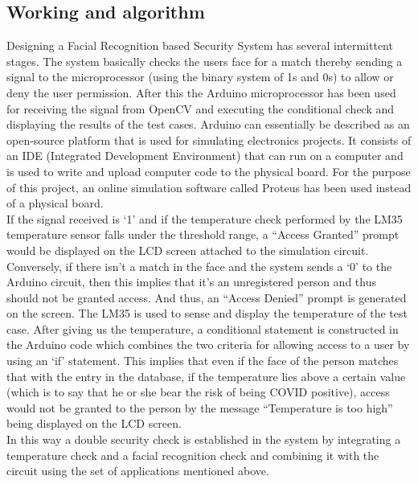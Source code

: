 \documentclass[conference]{IEEEtran}
\begin{document}
	\subsection{Working and algorithm}
	Designing a Facial Recognition based Security System has
	several intermittent stages. The system basically checks the users face for a match thereby sending a signal to the microprocessor (using the binary system of 1s and 0s) to allow or deny the user permission.
	After this the Arduino microprocessor has been used for
	receiving the signal from OpenCV \cite{8} and executing the
	conditional check and displaying the results of the test cases. Arduino can essentially be described as an open-source platform that is used for simulating electronics projects. It consists of an IDE (Integrated Development Environment) that can run on a computer and is used to write and upload computer code to the physical board. For the purpose of this project, an online simulation software called Proteus has been used instead of
	a physical board.
	\\If the signal received is ‘1’ and if the temperature check performed by the LM35 temperature sensor falls under the threshold range, a “Access Granted” prompt would be displayed on the LCD screen attached to the simulation circuit.
	\\Conversely, if there isn't a match in the face and the system sends a ‘0’ to the Arduino circuit, then this implies that it's an unregistered person and thus should not be granted access. And thus, an “Access Denied” prompt is generated on the screen. The LM35 is used to sense and display the temperature of the test case. After giving us the temperature, a conditional statement is constructed in the Arduino code which combines the two criteria for allowing access to a user by using an ‘if’ statement. This implies that even if the face of the person matches that with the entry in the database, if the temperature lies above a certain value (which is to say that he or she bear the risk of being COVID positive), access would not be granted to the person by the message “Temperature is too high” being
	displayed on the LCD screen.
	\\In this way a double security check is established in the system by integrating a temperature check and a facial recognition check and combining it with the circuit using the set of applications mentioned above.
\end{document}
